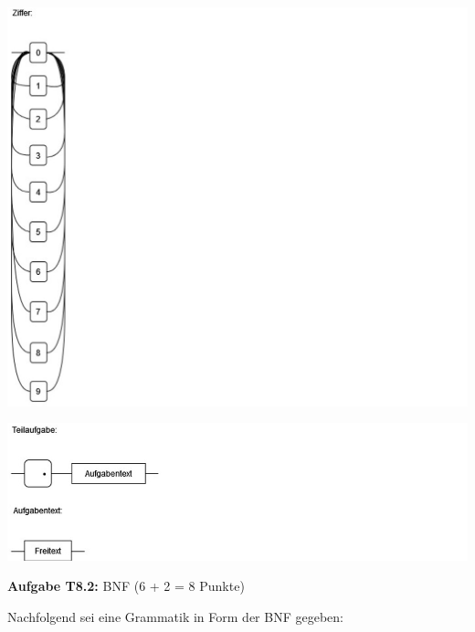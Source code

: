 \begin{itemize}
  \begin{center}
    \includegraphics[width=15 cm]{syntax3.jpg}
  \end{center}

  \begin{center}
    \includegraphics[width=15 cm]{syntax4.jpg}
  \end{center}

\end{itemize}

\newpage

\textbf{Aufgabe T8.2:} BNF (6 + 2 = 8 Punkte)

Nachfolgend sei eine Grammatik in Form der BNF gegeben:

